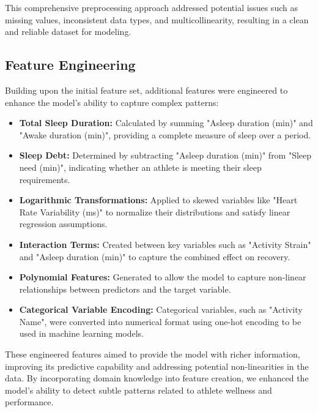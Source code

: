 \documentclass[manuscript,acmsmall,review,screen,authorversion=true]{acmart}
\begin{document}
This comprehensive preprocessing approach addressed potential issues such as missing values, inconsistent data types, and multicollinearity, resulting in a clean and reliable dataset for modeling.

\subsection{Feature Engineering}

Building upon the initial feature set, additional features were engineered to enhance the model's ability to capture complex patterns:

\begin{itemize}
    \item \textbf{Total Sleep Duration:} Calculated by summing "Asleep duration (min)" and "Awake duration (min)", providing a complete measure of sleep over a period.

    \item \textbf{Sleep Debt:} Determined by subtracting "Asleep duration (min)" from "Sleep need (min)", indicating whether an athlete is meeting their sleep requirements.

    \item \textbf{Logarithmic Transformations:} Applied to skewed variables like "Heart Rate Variability (ms)" to normalize their distributions and satisfy linear regression assumptions.

    \item \textbf{Interaction Terms:} Created between key variables such as "Activity Strain" and "Asleep duration (min)" to capture the combined effect on recovery.

    \item \textbf{Polynomial Features:} Generated to allow the model to capture non-linear relationships between predictors and the target variable.

    \item \textbf{Categorical Variable Encoding:} Categorical variables, such as "Activity Name", were converted into numerical format using one-hot encoding to be used in machine learning models.
\end{itemize}

These engineered features aimed to provide the model with richer information, improving its predictive capability and addressing potential non-linearities in the data. By incorporating domain knowledge into feature creation, we enhanced the model's ability to detect subtle patterns related to athlete wellness and performance.
\end{document}
